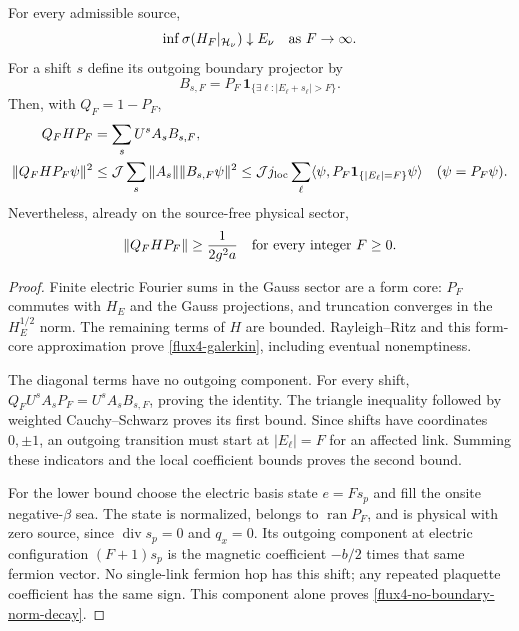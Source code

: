 \begin{lemma}
\label{flux4-sharp-boundary}
For every admissible source,
\begin{equation}
 \inf\sigma(H_F|_{\mathcal H_\nu})\downarrow E_\nu
 \quad\hbox{as }F\to\infty.
 \label{flux4-galerkin}
\end{equation}
For a shift $s$ define its outgoing boundary projector by
\[
 B_{s,F}=P_F\,{\mathbf1}_{\{\exists\ell:
                         |E_\ell+s_\ell|>F\}}.
\]
Then, with $Q_F=1-P_F$,
\begin{align}
 Q_FHP_F&=\sum_s U^sA_s B_{s,F},\label{flux4-boundary-identity}\\
 \|Q_FHP_F\psi\|^2
 &\le\mathcal J\sum_s\|A_s\|\|B_{s,F}\psi\|^2
 \le\mathcal J j_{\rm loc}
       \sum_\ell\langle\psi,
          P_F{\bf1}_{\{|E_\ell|=F\}}\psi\rangle
 \quad(\psi=P_F\psi).\label{flux4-boundary-bound}
\end{align}
Nevertheless, already on the source-free physical sector,
\begin{equation}
 \|Q_FHP_F\|\ge\frac1{2g^2a}
 \quad\hbox{for every integer }F\ge0.
 \label{flux4-no-boundary-norm-decay}
\end{equation}
\end{lemma}
\begin{proof}
Finite electric Fourier sums in the Gauss sector are a form core:
$P_F$ commutes with $H_E$ and the Gauss projections, and truncation
converges in the $H_E^{1/2}$ norm.  The remaining terms of $H$ are
bounded.  Rayleigh--Ritz and this form-core approximation prove
\eqref{flux4-galerkin}, including eventual nonemptiness.

The diagonal terms have no outgoing component.  For every shift,
$Q_FU^sA_sP_F=U^sA_sB_{s,F}$, proving the identity.  The triangle
inequality followed by weighted Cauchy--Schwarz proves its first
bound.  Since shifts have coordinates $0,\pm1$, an outgoing transition
must start at $|E_\ell|=F$ for an affected link.  Summing these
indicators and the local coefficient bounds proves the second bound.

For the lower bound choose the electric basis state $e=Fs_p$ and
fill the onsite negative-$\beta$ sea.  The state is normalized,
belongs to $\operatorname{ran}P_F$, and is physical with zero source,
since $\operatorname{div}s_p=0$ and $q_x=0$.  Its outgoing component
at electric configuration $(F+1)s_p$ is the magnetic coefficient
$-b/2$ times that same fermion vector.  No single-link fermion hop
has this shift; any repeated plaquette coefficient has the same sign.
This component alone proves \eqref{flux4-no-boundary-norm-decay}.
\end{proof}

